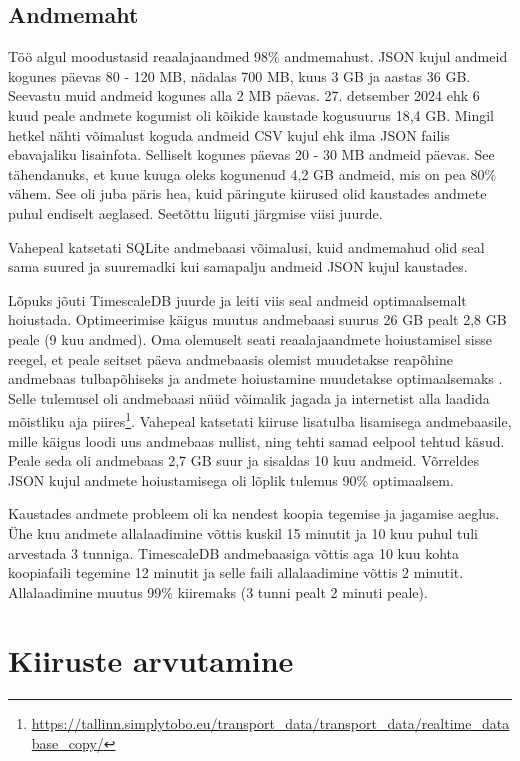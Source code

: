 \subsection{Andmemaht}

Töö algul moodustasid reaalajaandmed 98\% andmemahust. JSON kujul andmeid kogunes päevas 80 - 120 MB, nädalas 700 MB, kuus 3 GB ja aastas 36 GB. Seevastu muid andmeid kogunes alla 2 MB päevas. 27. detsember 2024 ehk 6 kuud peale andmete kogumist oli kõikide kaustade kogusuurus 18,4 GB. Mingil hetkel nähti võimalust koguda andmeid CSV kujul ehk ilma JSON failis ebavajaliku lisainfota. Selliselt kogunes päevas 20 - 30 MB andmeid päevas. See tähendanuks, et kuue kuuga oleks kogunenud 4,2 GB andmeid, mis on pea 80\% vähem. See oli juba päris hea, kuid päringute kiirused olid kaustades andmete puhul endiselt aeglased. Seetõttu liiguti järgmise viisi juurde.

Vahepeal katsetati SQLite andmebaasi võimalusi, kuid andmemahud olid seal sama suured ja suuremadki kui samapalju andmeid JSON kujul kaustades. 

Lõpuks jõuti TimescaleDB juurde ja leiti viis seal andmeid optimaalsemalt hoiustada.  Optimeerimise käigus muutus andmebaasi suurus 26 GB pealt 2,8 GB peale (9 kuu andmed). Oma olemuselt seati reaalajaandmete hoiustamisel sisse reegel, et peale seitset päeva andmebaasis olemist muudetakse reapõhine andmebaas tulbapõhiseks ja andmete hoiustamine muudetakse optimaalsemaks \cite{timescale_hypercore}. Selle tulemusel oli andmebaasi nüüd võimalik jagada ja internetist alla laadida mõistliku aja piires\footnote{\url{https://tallinn.simplytobo.eu/transport_data/transport_data/realtime_database_copy/}}. Vahepeal katsetati kiiruse lisatulba lisamisega andmebaasile, mille käigus loodi uus andmebaas nullist, ning tehti samad eelpool tehtud käsud. Peale seda oli andmebaas 2,7 GB suur ja sisaldas 10 kuu andmeid. Võrreldes JSON kujul andmete hoiustamisega oli lõplik tulemus 90\% optimaalsem.

Kaustades andmete probleem oli ka nendest koopia tegemise ja jagamise aeglus. Ühe kuu andmete allalaadimine võttis kuskil 15 minutit ja 10 kuu puhul tuli arvestada 3 tunniga. TimescaleDB andmebaasiga  võttis aga 10 kuu kohta koopiafaili tegemine 12 minutit ja selle faili allalaadimine võttis 2 minutit. Allalaadimine muutus 99\% kiiremaks (3 tunni pealt 2 minuti peale).

\section{Kiiruste arvutamine}

